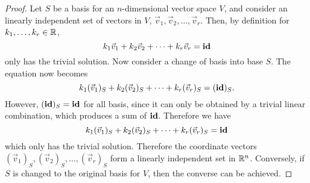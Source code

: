 \documentclass{article}
\begin{document}
\begin{proof}
    Let $S$ be a basis for an $n$-dimensional vector space $V$, and consider an linearly independent set of vectors in $V$, $\vec{v}_1,\vec{v}_2,\ldots,\vec{v}_r$. Then, by definition for $k_1,\ldots,k_r \in \mathbb{R}$,
    \[
        k_1\vec{v}_1 + k_2\vec{v}_2 + \cdots + k_r\vec{v}_r = \operatorname{\textbf{id}}
    \]
    only has the trivial solution. Now consider a change of basis into base $S$. The equation now becomes
    \[
        k_1(\vec{v}_1)_S + k_2(\vec{v}_2)_S + \cdots + k_r(\vec{v}_r)_S = (\operatorname{\textbf{id}})_S.
    \]
    However, $(\operatorname{\textbf{id}})_S = \operatorname{\textbf{id}}$ for all basis, since it can only be obtained by a trivial linear combination, which produces a sum of $\operatorname{\textbf{id}}$. Therefore we have
    \[
        k_1(\vec{v}_1)_S + k_2(\vec{v}_2)_S + \cdots + k_r(\vec{v}_r)_S = \operatorname{\textbf{id}}
    \]
    which only has the trivial solution. Therefore the coordinate vectors $(\vec{v}_1)_S,(\vec{v}_2)_S,\ldots,(\vec{v}_r)_S$ form a linearly independent set in $\mathbb{R}^n$. Conversely, if $S$ is changed to the original basis for $V$, then the converse can be achieved.
\end{proof}
\qdash
\end{document}
